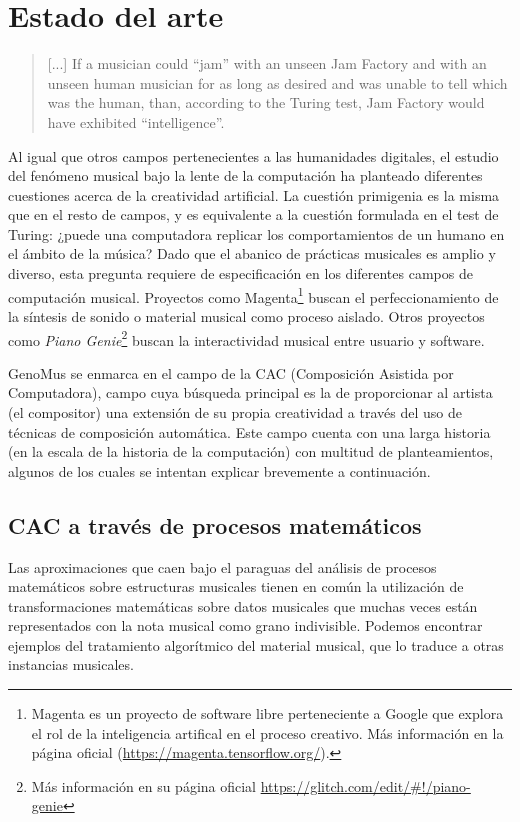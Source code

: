 \chapter{Estado del arte}


\begin{quote}
    [...] If a musician could ``jam'' with an unseen Jam Factory and with an unseen human musician for as long as desired and was unable to tell which was the human, than, according to the Turing test, Jam Factory would have exhibited ``intelligence''. \cite{musical_turing}
\end{quote}


Al igual que otros campos pertenecientes a las humanidades digitales, el estudio del fenómeno musical bajo la lente de la computación ha planteado diferentes cuestiones acerca de la creatividad artificial. La cuestión primigenia es la misma que en el resto de campos, y es equivalente a la cuestión formulada en el test de Turing: ¿puede una computadora replicar los comportamientos de un humano en el ámbito de la música? Dado que el abanico de prácticas musicales es amplio y diverso, esta pregunta requiere de especificación en los diferentes campos de computación musical. Proyectos como Magenta\footnote{Magenta es un proyecto de software libre perteneciente a Google que explora el rol de la inteligencia artifical en el proceso creativo. Más información en la página oficial (\url{https://magenta.tensorflow.org/}).} buscan el perfeccionamiento de la síntesis de sonido o material musical como proceso aislado. Otros proyectos como \textit{Piano Genie}\footnote{Más información en su página oficial \url{https://glitch.com/edit/\#!/piano-genie}} buscan la interactividad musical entre usuario y software.

GenoMus se enmarca en el campo de la CAC (Composición Asistida por Computadora), campo cuya búsqueda principal es la de proporcionar al artista (el compositor) una extensión de su propia creatividad a través del uso de técnicas de composición automática. Este campo cuenta con una larga historia (en la escala de la historia de la computación) con multitud de planteamientos, algunos de los cuales se intentan explicar brevemente a continuación.

\section{CAC a través de procesos matemáticos}

Las aproximaciones que caen bajo el paraguas del análisis de procesos matemáticos sobre estructuras musicales tienen en común la utilización de transformaciones matemáticas sobre datos musicales que muchas veces están representados con la nota musical como grano indivisible. Podemos encontrar ejemplos del tratamiento algorítmico del material musical, que lo traduce a otras instancias musicales.

